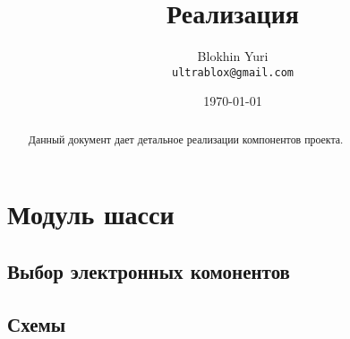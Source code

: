 \documentclass[utf8]{report}
\begin{document}
\title{Реализация}
\author{Blokhin Yuri\\
        \texttt{ultrablox@gmail.com}}
\date{\today}
\maketitle
 
\tableofcontents

\begin{abstract}
Данный документ дает детальное реализации компонентов проекта.
\end{abstract}

\chapter{Модуль шасси}

\section{Выбор электронных комонентов}

\section{Схемы}

\begin{thebibliography}{9}

\end{thebibliography}
 
\end{document}
